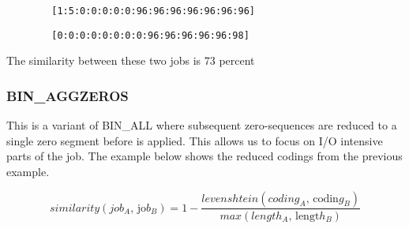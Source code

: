 \documentclass{jhps}
\begin{document}
\begin{listing}
	\noindent\begin{minipage}{0.50\textwidth}
		\begin{lstlisting}
		[1:5:0:0:0:0:0:96:96:96:96:96:96:96]
		\end{lstlisting}
		\vspace{-2em}
		\label{lst:test:a}
	\end{minipage}
	\hfill
	\noindent\begin{minipage}{0.50\textwidth}
		\begin{lstlisting}
		[0:0:0:0:0:0:0:0:96:96:96:96:96:98]
		\end{lstlisting}
		\vspace{-2em}
		\label{lst:test:b}
	\end{minipage}
	\caption{The similarity between these two jobs is 73 percent}
	\label{lst:test}
\end{listing}


\subsubsection{BIN\_AGGZEROS}
This is a variant of BIN\_ALL where subsequent zero-sequences are reduced to a single zero segment before  is applied.
This allows us to focus on I/O intensive parts of the job.
The example below shows the reduced codings from the previous example.

\begin{equation}
similarity \left( job_{A}\text{, jo}b_{B} \right) =1- \frac{levenshtein \left( coding_{A}\text{, codin}g_{B} \right) }{max \left( length_{A}\text{, lengt}h_{B} \right) } \label{eq:sim:bin_aggzeros}
\end{equation}

\end{document}
